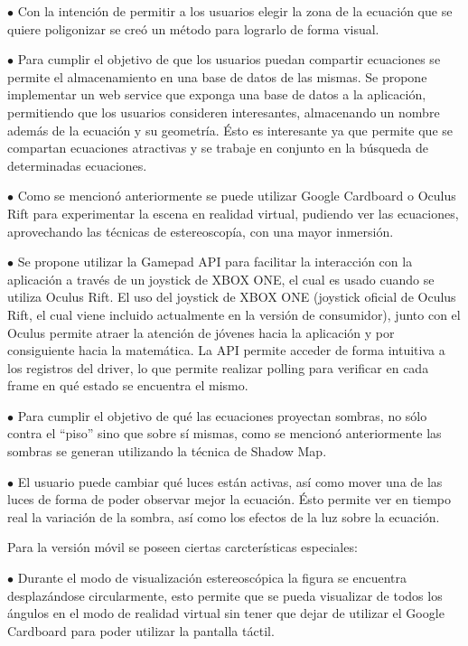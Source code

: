 \documentclass[12pt]{article}
\begin{document}
$\bullet$ Con la intención de permitir a los usuarios elegir la zona de la ecuación que se quiere poligonizar se creó un método para lograrlo de forma visual.  

$\bullet$ Para cumplir el objetivo de que los usuarios puedan compartir ecuaciones se permite el almacenamiento en una base de datos de las mismas. Se propone implementar un web service que exponga una base de datos a la aplicación, permitiendo que los usuarios consideren interesantes, almacenando un nombre además de la ecuación y su geometría. Ésto es interesante ya que permite que se compartan ecuaciones atractivas y se trabaje en conjunto en la búsqueda de determinadas ecuaciones. 

$\bullet$ Como se mencionó anteriormente se puede utilizar Google Cardboard o Oculus Rift para experimentar la escena en realidad virtual, pudiendo ver las ecuaciones, aprovechando las técnicas de estereoscopía, con una mayor inmersión.

$\bullet$ Se propone utilizar la Gamepad API\cite{gamepadapi} para facilitar la interacción con la aplicación a través de un joystick de XBOX ONE, el cual es usado cuando se utiliza Oculus Rift. El uso del joystick de XBOX ONE (joystick oficial de Oculus Rift, el cual viene incluido actualmente en la versión de consumidor), junto con el Oculus permite atraer la atención de jóvenes hacia la aplicación y por consiguiente hacia la matemática. La API permite acceder de forma intuitiva a los registros del driver\cite{engine}, lo que permite realizar polling para verificar en cada frame en qué estado se encuentra el mismo.

$\bullet$ Para cumplir el objetivo de qué las ecuaciones proyectan sombras, no sólo contra el “piso” sino que sobre sí mismas, como se mencionó anteriormente las sombras se generan utilizando la técnica de Shadow Map\cite{shadowmap}\cite{realtimerendering}.


$\bullet$ El usuario puede cambiar qué luces están activas, así como mover una de las luces de forma de poder observar mejor la ecuación. Ésto permite ver en tiempo real la variación de la sombra, así como los efectos de la luz sobre la ecuación. 


Para la versión móvil se poseen ciertas carcterísticas especiales: 

$\bullet$ Durante el modo de visualización estereoscópica la figura se encuentra desplazándose circularmente, esto permite que se pueda visualizar de todos los ángulos en el modo de realidad virtual sin tener que dejar de utilizar el Google Cardboard para poder utilizar la pantalla táctil.
\end{document}
